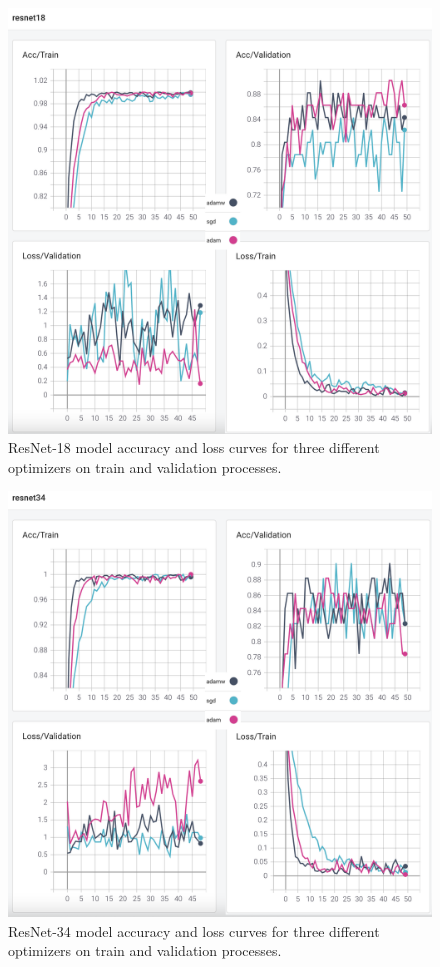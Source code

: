\begin{figure}[!h]
	\centering
	\includegraphics[width=\linewidth]{fig/resnet18.png}
	\vspace{2mm}
	\caption{ResNet-18 model accuracy and loss curves for three different optimizers on train and validation processes.}
	\label{fig:resnet18_plots}
\end{figure}

\begin{figure}[!h]
	\centering
	\includegraphics[width=\linewidth]{fig/resnet34.png}
	\vspace{2mm}
	\caption{ResNet-34 model accuracy and loss curves for three different optimizers on train and validation processes.}
	\label{fig:resnet34_plots}
\end{figure}

